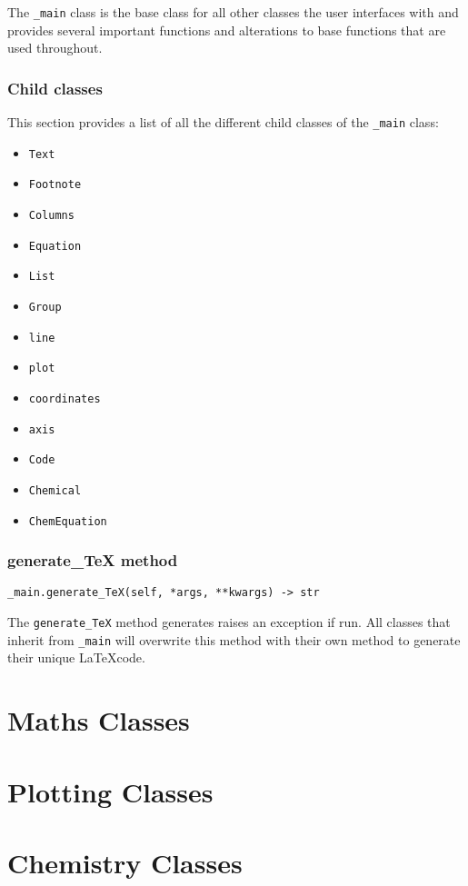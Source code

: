 \documentclass{article}
\begin{document}
The \verb|_main| class is the base class for all other classes the user interfaces with and provides several important functions and alterations to base functions that are used throughout.\subsubsection[Child classes]{Child classes}
This section provides a list of all the different child classes of the \verb|_main| class:\begin{multicols}{2}\begin{itemize}
\item \verb|Text|
\item \verb|Footnote|
\item \verb|Columns|
\item \verb|Equation|
\item \verb|List|
\item \verb|Group|
\item \verb|line|
\item \verb|plot|
\item \verb|coordinates|
\item \verb|axis|
\item \verb|Code|
\item \verb|Chemical|
\item \verb|ChemEquation|
\end{itemize}
\end{multicols}\subsubsection[generate\_TeX method]{generate\_TeX method}
\lstset{language=Python}
\begin{lstlisting}
_main.generate_TeX(self, *args, **kwargs) -> str
\end{lstlisting}
The \verb|generate_TeX| method generates raises an exception if run. All classes that inherit from \verb|_main| will overwrite this method with their own method to generate their unique \LaTeX  code.\section[Maths Classes]{Maths Classes}
\section[Plotting Classes]{Plotting Classes}
\section[Chemistry Classes]{Chemistry Classes}
\end{document}
